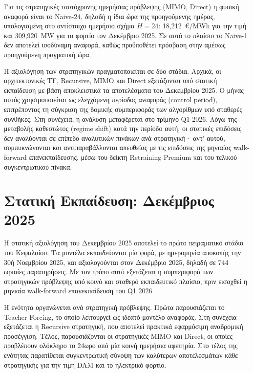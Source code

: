 \noindent Για τις στρατηγικές ταυτόχρονης ημερήσιας πρόβλεψης
(MIMO, Direct) η φυσική αναφορά είναι το Naive-24, δηλαδή η ίδια ώρα της προηγούμενης
ημέρας, υπολογισμένη στο αντίστοιχο ημερήσιο σχήμα $H=24$: 18,212~€/MWh για την
τιμή και 309,920~MW για το φορτίο τον Δεκέμβριο 2025. Σε αυτό το πλαίσιο το Naive-1
δεν αποτελεί ισοδύναμη αναφορά, καθώς προϋποθέτει πρόσβαση στην αμέσως προηγούμενη
πραγματική ώρα.

\noindent Η αξιολόγηση των στρατηγικών πραγματοποιείται σε δύο στάδια. Αρχικά, οι
αρχιτεκτονικές TF, Recursive, MIMO και Direct εξετάζονται υπό στατική εκπαίδευση με βάση
αποκλειστικά τα αποτελέσματα του Δεκεμβρίου 2025. Ο μήνας αυτός χρησιμοποιείται ως ελεγχόμενη
περίοδος αναφοράς (control period), επιτρέποντας τη σύγκριση της δομικής συμπεριφοράς των
αλγορίθμων υπό σταθερές συνθήκες. Στη συνέχεια, η ανάλυση μεταφέρεται στο τρίμηνο
Q1 2026. Λόγω της μεταβολής καθεστώτος (regime shift) κατά την περίοδο αυτή, οι στατικές
επιδόσεις δεν αναλύονται σε επίπεδο αναλυτικών πινάκων ανά στρατηγική· αντ' αυτού,
συμπυκνώνονται και αντιπαραβάλλονται απευθείας με τις επιδόσεις της μηνιαίας
walk-forward επανεκπαίδευσης, μέσω του δείκτη Retraining Premium και του τελικού
συγκεντρωτικού πίνακα.

\section{Στατική Εκπαίδευση: Δεκέμβριος 2025}
\label{sec:static_dec}

Η στατική αξιολόγηση του Δεκεμβρίου 2025 αποτελεί το πρώτο πειραματικό στάδιο του
Κεφαλαίου. Τα μοντέλα εκπαιδεύονται μία φορά, με ημερομηνία αποκοπής την 30ή
Νοεμβρίου 2025, και αξιολογούνται στον Δεκέμβριο 2025, δηλαδή σε 744 ωριαίες
παρατηρήσεις. Με τον τρόπο αυτό εξετάζεται η συμπεριφορά των στρατηγικών πρόβλεψης
υπό κοινό και σταθερό εκπαιδευτικό πλαίσιο, πριν εισαχθεί η μηνιαία walk-forward
επανεκπαίδευση του Q1 2026.

Η ενότητα οργανώνεται ανά στρατηγική πρόβλεψης. Πρώτα παρουσιάζεται το
Teacher-Forcing, το οποίο λειτουργεί ως ιδεατό μοντέλο αναφοράς. Στη συνέχεια
εξετάζεται η Recursive στρατηγική, που αποτελεί πρακτικά εφαρμόσιμη αναδρομική
προσέγγιση. Τέλος, παρουσιάζονται οι στρατηγικές MIMO και Direct, οι οποίες
προβλέπουν ολόκληρο το 24ωρο από μία κοινή ημερήσια αφετηρία. Στο τέλος της ενότητας
παρατίθεται συγκεντρωτική σύνοψη των καλύτερων αποτελεσμάτων κάθε στρατηγικής για
την τιμή DAM και το ηλεκτρικό φορτίο.

